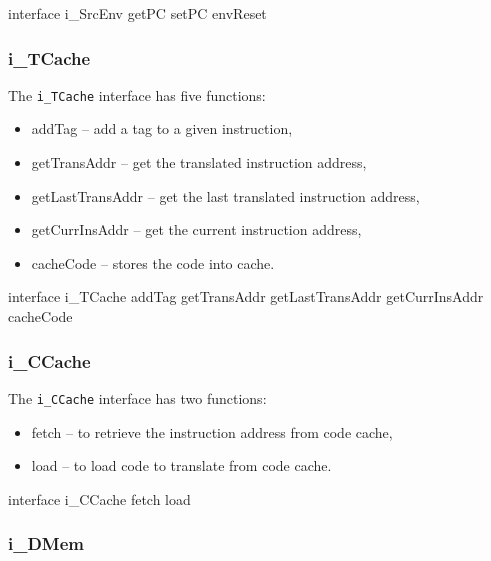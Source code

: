 \documentclass[11pt]{report}
\begin{document}
			\begin{EL}
			interface i_SrcEnv {
				getPC
				setPC
				envReset
			}
			\end{EL}
			
			\subsubsection*{i\_TCache}
			
			\par The \texttt{i\_TCache} interface has five functions:
			\begin{itemize}
				\item addTag -- add a tag to a given instruction,
				\item getTransAddr -- get the translated instruction address,
				\item getLastTransAddr -- get the last translated instruction address, 
				\item getCurrInsAddr -- get the current instruction address,
				\item cacheCode -- stores the code into cache.
			\end{itemize}
		
			\begin{EL}
			interface i_TCache {
				addTag 			
				getTransAddr		
				getLastTransAddr 	
				getCurrInsAddr	
				cacheCode		
			}
			\end{EL}
			
			\subsubsection*{i\_CCache}
			
			\par The \texttt{i\_CCache} interface has two functions:
			\begin{itemize}
				\item fetch -- to retrieve the instruction address from code cache,
				\item load -- to load code to translate from code cache.
			\end{itemize}
			
			\begin{EL}
			interface i_CCache {
				fetch	
				load
			}
			\end{EL}
			
			\subsubsection*{i\_DMem}
			
\end{document}
